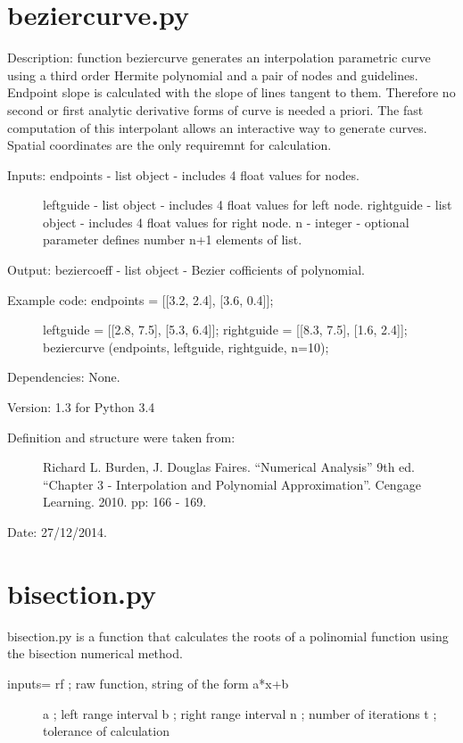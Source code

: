 \documentclass[letterpaper,10pt,oneside]{sphinxmanual}
\theoremstyle{plain}%
\theoremstyle{definition}%
\theoremstyle{remark}%
\begin{document}
\section{beziercurve.py}
\label{code:beziercurve-py}\label{code:module-beziercurve}
Description: function beziercurve generates an interpolation parametric
curve using a third order Hermite polynomial and a pair of nodes and
guidelines. Endpoint slope is calculated with the slope of lines
tangent to them. Therefore no second or first analytic derivative 
forms of curve is needed a priori. The fast computation of this interpolant
allows an interactive way to generate curves. Spatial coordinates are
the only requiremnt for calculation.
\begin{description}
\item[{Inputs: endpoints - list object - includes 4 float values for nodes.}] \leavevmode
leftguide - list object - includes 4 float values for left node.
rightguide - list object - includes 4 float values for right node.
n - integer - optional parameter defines number n+1 elements of list.

\end{description}

Output: beziercoeff - list object - Bezier cofficients of polynomial.
\begin{description}
\item[{Example code: endpoints = {[}{[}3.2, 2.4{]}, {[}3.6, 0.4{]}{]};}] \leavevmode
leftguide = {[}{[}2.8, 7.5{]}, {[}5.3, 6.4{]}{]};
rightguide = {[}{[}8.3, 7.5{]}, {[}1.6, 2.4{]}{]};
beziercurve (endpoints, leftguide, rightguide, n=10);

\end{description}

Dependencies: None.

Version: 1.3 for Python 3.4
\begin{description}
\item[{Definition and structure were taken from:}] \leavevmode
Richard L. Burden, J. Douglas Faires. ``Numerical Analysis'' 9th ed.
``Chapter 3 - Interpolation and Polynomial Approximation''. 
Cengage Learning. 2010. pp: 166 - 169.

\end{description}




Date: 27/12/2014.


\section{bisection.py}
\label{code:bisection-py}\label{code:module-bisection}
bisection.py is a function that calculates the roots of a polinomial function
using the bisection numerical method.
\begin{description}
\item[{inputs= rf ; raw function, string of the form a*x+b}] \leavevmode
a ; left range interval
b ; right range interval
n ; number of iterations
t ; tolerance of calculation

\end{description}
\end{document}
